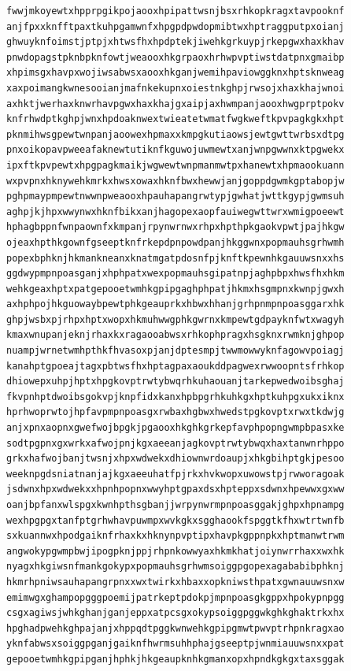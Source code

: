 \documentclass[11pt,letterpaper]{exam}
\begin{document}
\begin{questions}
\begin{verbatim}
fwwjmkoyewtxhpprpgikpojaooxhpipattwsnjbsxrhkopkragxtavpooknf
anjfpxxknfftpaxtkuhpgamwnfxhpgpdpwdopmibtwxhptraggputpxoianj
ghwuyknfoimstjptpjxhtwsfhxhpdptekjiwehkgrkuypjrkepgwxhaxkhav
pnwdopagstpknbpknfowtjweaooxhkgrpaoxhrhwpvptiwstdatpnxgmaibp
xhpimsgxhavpxwojiwsabwsxaooxhkganjwemihpaviowggknxhptsknweag
xaxpoimangkwnesooianjmafnkekupnxoiestnkghpjrwsojxhaxkhajwnoi
axhktjwerhaxknwrhavpgwxhaxkhajgxaipjaxhwmpanjaooxhwgprptpokv
knfrhwdptkghpjwnxhpdoaknwextwieatetwmatfwgkweftkpvpagkgkxhpt
pknmihwsgpewtwnpanjaoowexhpmaxxkmpgkutiaowsjewtgwttwrbsxdtpg
pnxoikopavpweeafaknewtutiknfkguwojuwmewtxanjwnpgwwnxktpgwekx
ipxftkpvpewtxhpgpagkmaikjwgwewtwnpmanmwtpxhanewtxhpmaookuann
wxpvpnxhknywehkmrkxhwsxowaxhknfbwxhewwjanjgoppdgwmkgptabopjw
pghpmaypmpewtnwwnpweaooxhpauhapangrwtypjgwhatjwttkgypjgwmsuh
aghpjkjhpxwwynwxhknfbikxanjhagopexaopfauiwegwttwrxwmigpoeewt
hphagbppnfwnpaownfxkmpanjrpynwrnwxrhpxhpthpkgaokvpwtjpajhkgw
ojeaxhpthkgownfgseeptknfrkepdpnpowdpanjhkggwnxpopmauhsgrhwmh
popexbphknjhkmankneanxknatmgatpdosnfpjknftkpewnhkgauuwsnxxhs
ggdwypmpnpoasganjxhphpatxwexpopmauhsgipatnpjaghpbpxhwsfhxhkm
wehkgeaxhptxpatgepooetwmhkgpipgaghphpatjhkmxhsgmpnxkwnpjgwxh
axhphpojhkguowaybpewtphkgeauprkxhbwxhhanjgrhpnmpnpoasggarxhk
ghpjwsbxpjrhpxhptxwopxhkmuhwwgphkgwrnxkmpewtgdpayknfwtxwagyh
kmaxwnupanjeknjrhaxkxragaooabwsxrhkophpragxhsgknxrwmknjghpop
nuampjwrnetwmhpthkfhvasoxpjanjdptesmpjtwwmowwyknfagowvpoiagj
kanahptgpoeajtagxpbtwsfhxhptagpaxaoukddpagwexrwwoopntsfrhkop
dhiowepxuhpjhptxhpgkovptrwtybwqrhkuhaouanjtarkepwedwoibsghaj
fkvpnhptdwoibsgokvpjknpfidxkanxhpbpgrhkuhkgxhptkuhpgxukxiknx
hprhwoprwtojhpfavpmpnpoasgxrwbaxhgbwxhwedstpgkovptxrwxtkdwjg
anjxpnxaopnxgwefwojbpgkjpgaooxhkghkgrkepfavphpopngwmpbpasxke
sodtpgpnxgxwrkxafwojpnjkgxaeeanjagkovptrwtybwqxhaxtanwnrhppo
grkxhafwojbanjtwsnjxhpxwdwekxdhiownwrdoaupjxhkgbihptgkjpesoo
weeknpgdsniatnanjajkgxaeeuhatfpjrkxhvkwopxuwowstpjrwworagoak
jsdwnxhpxwdwekxxhpnhpopnxwwyhptgpaxdsxhpteppxsdwnxhpewwxgxww
oanjbpfanxwlspgxkwnhpthsgbanjjwrpynwrmpnpoasggakjghpxhpnampg
wexhpgpgxtanfptgrhwhavpuwmpxwvkgkxsgghaookfspggtkfhxwtrtwnfb
sxkuannwxhpodgaiknfrhaxkxhknynpvptipxhavpkgppnpkxhptmanwtrwm
angwokypgwmpbwjipogpknjppjrhpnkowwyaxhkmkhatjoiynwrrhaxxwxhk
nyagxhkgiwsnfmankgokypxpopmauhsgrhwmsoiggpgopexagababibphknj
hkmrhpniwsauhapangrpnxxwxtwirkxhbaxxopkniwsthpatxgwnauuwsnxw
emimwgxghampopgggpoemijpatrkeptpdokpjmpnpoasgkgppxhpokypnpgg
csgxagiwsjwhkghanjganjeppxatpcsgxokypsoiggpggwkghkghaktrkxhx
hpghadpwehkghpajanjxhppqdtpggkwnwehkgpipgmwtpwvptrhpnkragxao
yknfabwsxsoiggpganjgaiknfhwrmsuhhphajgseeptpjwnmiauuwsnxxpat
gepooetwmhkgpipganjhphkjhkgeaupknhkgmanxopxhpndkgkgxtaxsggak

\end{verbatim}
\end{questions}
\end{document}
